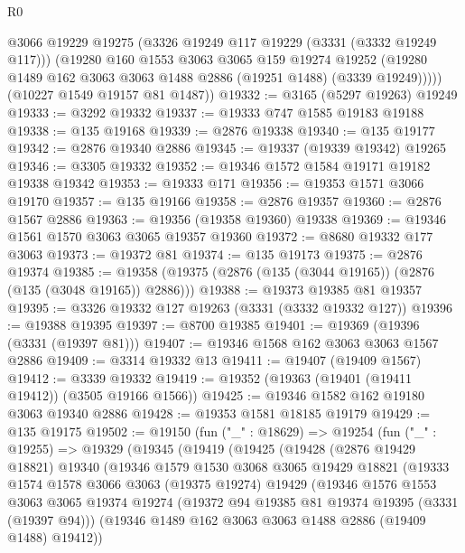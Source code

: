 \begin{lexlean}{R0}
\begin{coremodule}
          @3066
          @19229
          @19275
          (@3326 @19249 @117 @19229 (@3331 (@3332 @19249 @117)))
          (@19280
            @160
            @1553
            @3063
            @3065
            @159
            @19274
            @19252
            (@19280 @1489 @162 @3063 @3063 @1488 @2886 (@19251 @1488) (@3339 @19249)))))
      (@10227 @1549 @19157 @81 @1487))
@19332 := @3165 (@5297 @19263) @19249
@19333 := @3292 @19332
@19337 := @19333 @747 @1585 @19183 @19188
@19338 := @135 @19168
@19339 := @2876 @19338
@19340 := @135 @19177
@19342 := @2876 @19340 @2886
@19345 := @19337 (@19339 @19342) @19265
@19346 := @3305 @19332
@19352 := @19346 @1572 @1584 @19171 @19182 @19338 @19342
@19353 := @19333 @171
@19356 := @19353 @1571 @3066 @19170
@19357 := @135 @19166
@19358 := @2876 @19357
@19360 := @2876 @1567 @2886
@19363 := @19356 (@19358 @19360) @19338
@19369 := @19346 @1561 @1570 @3063 @3065 @19357 @19360
@19372 := @8680 @19332 @177 @3063
@19373 := @19372 @81
@19374 := @135 @19173
@19375 := @2876 @19374
@19385 := @19358 (@19375 (@2876 (@135 (@3044 @19165)) (@2876 (@135 (@3048 @19165)) @2886)))
@19388 := @19373 @19385 @81 @19357
@19395 := @3326 @19332 @127 @19263 (@3331 (@3332 @19332 @127))
@19396 := @19388 @19395
@19397 := @8700 @19385
@19401 := @19369 (@19396 (@3331 (@19397 @81)))
@19407 := @19346 @1568 @162 @3063 @3063 @1567 @2886
@19409 := @3314 @19332 @13
@19411 := @19407 (@19409 @1567)
@19412 := @3339 @19332
@19419 := @19352 (@19363 (@19401 (@19411 @19412)) (@3505 @19166 @1566))
@19425 := @19346 @1582 @162 @19180 @3063 @19340 @2886
@19428 := @19353 @1581 @18185 @19179
@19429 := @135 @19175
@19502 := @19150
    (fun ("_" : @18629) =>
    @19254
      (fun ("_" : @19255) =>
      @19329
        (@19345
          (@19419
            (@19425
              (@19428
                (@2876 @19429 @18821)
                @19340
                (@19346
                  @1579
                  @1530
                  @3068
                  @3065
                  @19429
                  @18821
                  (@19333
                    @1574
                    @1578
                    @3066
                    @3063
                    (@19375 @19274)
                    @19429
                    (@19346
                      @1576
                      @1553
                      @3063
                      @3065
                      @19374
                      @19274
                      (@19372 @94 @19385 @81 @19374 @19395 (@3331 (@19397 @94)))
                      (@19346 @1489 @162 @3063 @3063 @1488 @2886 (@19409 @1488) @19412))

\end{coremodule}
\end{lexlean}
